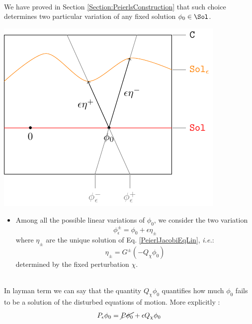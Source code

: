 \documentclass[Main]{subfiles}
\begin{document}
		\vspace{1mm}
		\\
		We have proved in Section \ref{Section:PeierlsConstruction} that such choice determines two particular variation of any fixed solution $\phi_0 \in \Sol$.

		\vspace{1mm}		
		\begin{minipage}{0.5\textwidth}
			\includegraphics[width=\textwidth]{Pictures/GeometricPicture2}
		\end{minipage}
		\begin{minipage}{0.5\textwidth}
			\begin{itemize}
				\item	Among all the possible linear variations of $\phi_0$, we consider the two variation $$\phi_\epsilon^\pm = \phi_0 + \epsilon \eta_\pm$$ where $\eta_\pm$ are the unique solution of Eq. \ref{PeierlJacobiEqLin}, \textit{i.e.}:
					\begin{displaymath}
   						\eta_\pm = G^\pm \left( - Q_\chi \phi_0 \right)
					\end{displaymath}
					determined by the fixed perturbation $\chi$.
			\end{itemize}
		\end{minipage}
		\vspace{1mm}\\		
	
		In layman term we can say that the quantity $Q_\chi \phi_0$ quantifies how much $\phi_0$ fails to be a solution of the disturbed equations of motion.
		More explicitly :
		\begin{displaymath}
			P_\epsilon \phi_0 =  \cancel{P \phi_0} + \epsilon Q_\chi \phi_0
		\end{displaymath}
		
\end{document}

